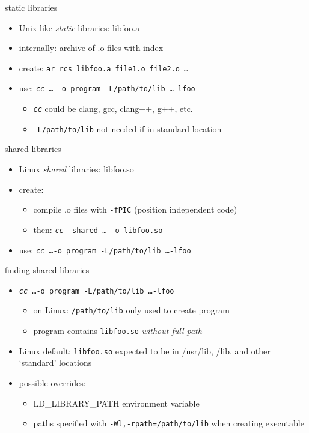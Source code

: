 \begin{frame}{static libraries}
    \begin{itemize}
    \item Unix-like \textit{static} libraries: libfoo.a
    \item internally: archive of .o files with index
    \item create: \texttt{ar rcs libfoo.a file1.o file2.o \ldots}
    \item use: \texttt{\textit{cc} \ldots~-o program -L/path/to/lib \ldots -lfoo}
        \begin{itemize}
        \item \texttt{\textit{cc}} could be clang, gcc, clang++, g++, etc.
        \item \texttt{-L/path/to/lib} not needed if in standard location
        \end{itemize}
    \end{itemize}
\end{frame}

\begin{frame}{shared libraries}
    \begin{itemize}
    \item Linux \textit{shared} libraries: libfoo.so
    \item create:
        \begin{itemize}
        \item compile .o files with \texttt{-fPIC} (position independent code)
        \item then: \texttt{\textit{cc} -shared \ldots~-o libfoo.so}
        \end{itemize}
    \item use: \texttt{\textit{cc} \ldots -o program -L/path/to/lib \ldots -lfoo}
    \end{itemize}
\end{frame}

\begin{frame}{finding shared libraries}
    \begin{itemize}
    \item \texttt{\textit{cc} \ldots -o program -L/path/to/lib \ldots -lfoo}
        \begin{itemize}
        \item on Linux: \texttt{/path/to/lib} only used to create program
        \item program contains \texttt{libfoo.so} \textit{without full path}
        \end{itemize}
    \item Linux default: \texttt{libfoo.so} expected to be in /usr/lib, /lib, and other `standard' locations
    \item possible overrides:
        \begin{itemize}
        \item LD\_LIBRARY\_PATH environment variable
        \item paths specified with \texttt{-Wl,-rpath=/path/to/lib} when creating executable
        \end{itemize}
    \end{itemize}
\end{frame}
